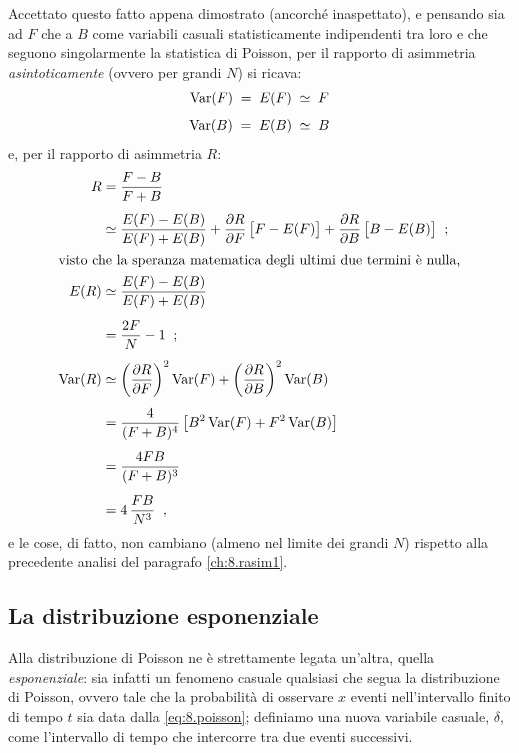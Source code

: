 Accettato questo fatto appena dimostrato (ancorch\'e
inaspettato), e pensando sia ad $F$ che a $B$ come variabili
casuali statisticamente indipendenti tra loro e che seguono
singolarmente la statistica di Poisson, per il rapporto di
asimmetria \emph{asintoticamente} (ovvero per grandi $N$) si
ricava:
\begin{gather*}
  \operatorname{Var}(F) \; = \; E(F) \; \simeq \; F \\[1ex]
  \operatorname{Var}(B) \; = \; E(B) \; \simeq \; B
\end{gather*}
e, per il rapporto di asimmetria $R$:
\begin{align*}
  R &= \frac{F - B}{F + B} \\[1ex]
  &\simeq \frac{E(F) - E(B)}{E(F) + E(B)} + \frac{\partial
    R}{\partial F} \, \bigl[ F - E(F) \bigr] +
  \frac{\partial R}{\partial B} \, \bigl[ B - E(B) \bigr]
  \;\; ; \\
  \intertext{visto che la speranza matematica degli ultimi
    due termini \`e nulla,}
  E(R) &\simeq \frac{E(F) - E(B)}{E(F) + E(B)} \\[1ex]
  &= \frac{2 F}{N} - 1 \;\; ; \\[1ex]
  \operatorname{Var}(R) &\simeq \left( \frac{\partial R}{\partial F}
  \right)^2 \operatorname{Var}(F) + \left( \frac{\partial R}{\partial B}
  \right)^2 \operatorname{Var}(B) \\[1ex]
  &= \frac{4}{(F + B)^4} \left[ B^2 \operatorname{Var}(F) + F^2 \operatorname{Var}(B)
  \right] \\[1ex]
  &= \frac{4 F B}{(F + B)^3} \\[1ex]
  &= 4 \, \frac{F B}{N^3} \;\; ,
\end{align*}
e le cose, di fatto, non cambiano (almeno nel limite dei
grandi $N$) rispetto alla precedente analisi del paragrafo
\ref{ch:8.rasim1}.%

\subsection{La distribuzione esponenziale}%
Alla distribuzione di Poisson ne \`e strettamente legata
un'altra, quella \emph{esponenziale}: sia infatti un
fenomeno casuale qualsiasi che segua la distribuzione di
Poisson, ovvero tale che la probabilit\`a di osservare $x$
eventi nell'intervallo finito di tempo $t$ sia data dalla
\eqref{eq:8.poisson}; definiamo una nuova variabile casuale,
$\delta$, come l'intervallo di tempo che intercorre tra due
eventi successivi.

